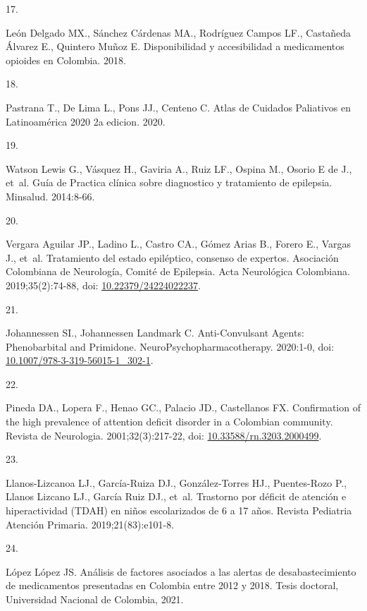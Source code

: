 \documentclass[
]{book}
\newlength{\cslhangindent}
\newlength{\csllabelwidth}
\newlength{\cslentryspacingunit} %
\newenvironment{CSLReferences}[2] %
 {%
  \setlength{\parindent}{0pt}
  \ifodd #1
  \let\oldpar\par
  \def\par{\hangindent=\cslhangindent\oldpar}
  \fi
  \setlength{\parskip}{#2\cslentryspacingunit}
 }%
 {}
\newcommand{\CSLLeftMargin}[1]{\parbox[t]{\csllabelwidth}{#1}}
\newcommand{\CSLRightInline}[1]{\parbox[t]{\linewidth - \csllabelwidth}{#1}\break}
\begin{document}
\begin{CSLReferences}{0}{0}
\leavevmode{}%
\CSLLeftMargin{17. }
\CSLRightInline{León Delgado MX., Sánchez Cárdenas MA., Rodríguez Campos LF., Castañeda Álvarez E., Quintero Muñoz E. {Disponibilidad y accesibilidad a medicamentos opioides en Colombia}. 2018.}

\leavevmode{}%
\CSLLeftMargin{18. }
\CSLRightInline{Pastrana T., De Lima L., Pons JJ., Centeno C. {Atlas de Cuidados Paliativos en Latinoam{é}rica 2020 2a edicion}. 2020.}

\leavevmode{}%
\CSLLeftMargin{19. }
\CSLRightInline{Watson Lewis G., Vásquez H., Gaviria A., Ruiz LF., Ospina M., Osorio E de J., et~al. {Gu{í}a de Practica cl{í}nica sobre diagnostico y tratamiento de epilepsia}. Minsalud. 2014:8-66.}

\leavevmode{}%
\CSLLeftMargin{20. }
\CSLRightInline{Vergara Aguilar JP., Ladino L., Castro CA., Gómez Arias B., Forero E., Vargas J., et~al. {Tratamiento del estado epil{é}ptico, consenso de expertos. Asociaci{ó}n Colombiana de Neurolog{í}a, Comit{é} de Epilepsia}. Acta Neurol{ó}gica Colombiana. 2019;35(2):74-88, doi: \href{https://doi.org/10.22379/24224022237}{10.22379/24224022237}.}

\leavevmode{}%
\CSLLeftMargin{21. }
\CSLRightInline{Johannessen SI., Johannessen Landmark C. {Anti-Convulsant Agents: Phenobarbital and Primidone}. NeuroPsychopharmacotherapy. 2020:1-0, doi: \href{https://doi.org/10.1007/978-3-319-56015-1_302-1}{10.1007/978-3-319-56015-1\_302-1}.}

\leavevmode{}%
\CSLLeftMargin{22. }
\CSLRightInline{Pineda DA., Lopera F., Henao GC., Palacio JD., Castellanos FX. {Confirmation of the high prevalence of attention deficit disorder in a Colombian community}. Revista de Neurologia. 2001;32(3):217-22, doi: \href{https://doi.org/10.33588/rn.3203.2000499}{10.33588/rn.3203.2000499}.}

\leavevmode{}%
\CSLLeftMargin{23. }
\CSLRightInline{Llanos-Lizcanoa LJ., García-Ruiza DJ., González-Torres HJ., Puentes-Rozo P., Llanos Lizcano LJ., García Ruiz DJ., et~al. {Trastorno por d{é}ficit de atenci{ó}n e hiperactividad (TDAH) en ni{ñ}os escolarizados de 6 a 17 a{ñ}os}. Revista Pediatria Atenci{ó}n Primaria. 2019;21(83):e101-8.}

\leavevmode{}%
\CSLLeftMargin{24. }
\CSLRightInline{López López JS. {An{á}lisis de factores asociados a las alertas de desabastecimiento de medicamentos presentadas en Colombia entre 2012 y 2018}. Tesis doctoral, Universidad Nacional de Colombia, 2021.}


\end{CSLReferences}
\end{document}
